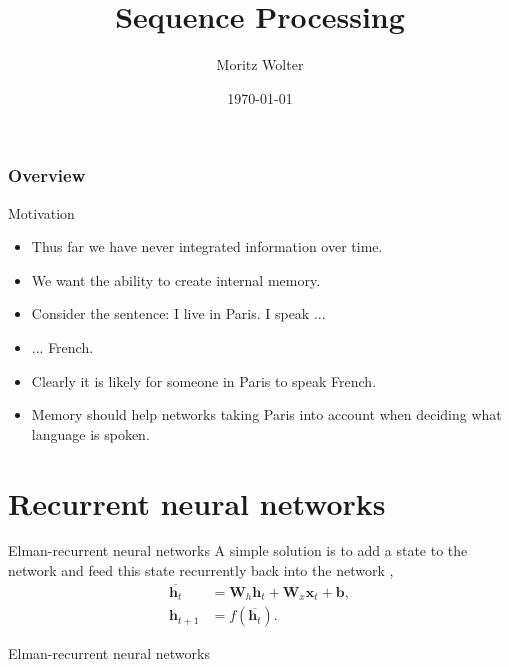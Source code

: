 \documentclass{beamer}
\title{Sequence Processing}
\date{\today}
\institute{Uni Bonn}
\author{Moritz Wolter}
\begin{document}
    \maketitle

    \begin{frame}
    \frametitle{Overview} 
    \tableofcontents

    \end{frame}

    \begin{frame}{Motivation}
      \begin{itemize}
        \item Thus far we have never integrated information over time.
        \item We want the ability to create internal memory.
        \item Consider the sentence: I live in Paris. I speak ...
        \item ... French.
        \item Clearly it is likely for someone in Paris to speak French.
        \item Memory should help networks taking Paris into account when deciding what language is spoken.
      \end{itemize}
    \end{frame}

    \section{Recurrent neural networks}
    \begin{frame}{Elman-recurrent neural networks}
    A simple solution is to add a state to the network and feed this state recurrently back into the network \cite{elman1990finding},
    \begin{align}
        \overline{\mathbf{h}_t} &= \mathbf{W}_h \mathbf{h}_t 
            + \mathbf{W}_x \mathbf{x}_t + \mathbf{b}, \label{eq:simple_rnn} \\
        \mathbf{h}_{t+1} &= f(\overline{\mathbf{h}_t}).
    \end{align}
    \end{frame}

    \begin{frame}{Elman-recurrent neural networks}
      \begin{figure}
        
      \end{figure}
    \end{frame}
\end{document}
